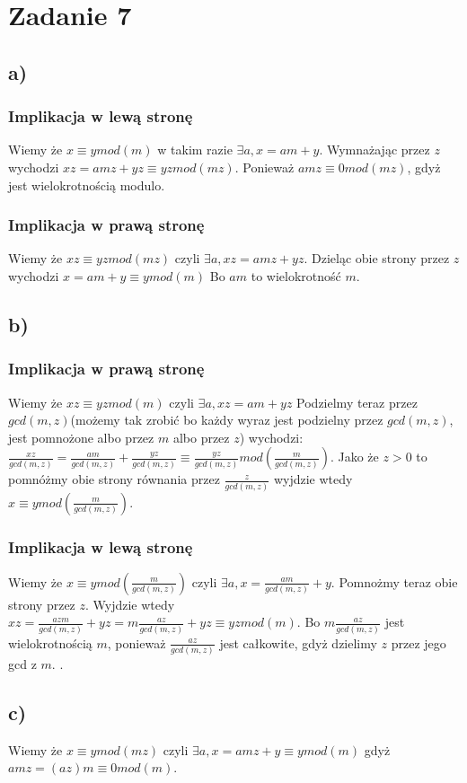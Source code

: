 \documentclass{article}
\begin{document}
\section*{Zadanie 7}
\subsection*{a)}
\subsubsection*{Implikacja w lewą stronę}
Wiemy że $x \equiv y mod(m)$ w takim razie $\exists a, x = a m + y$. Wymnażając przez $z$ wychodzi $x z = a m z + y z \equiv y z mod(m z)$. Ponieważ $a m z \equiv 0 mod(m z)$, gdyż jest wielokrotnością modulo.

\subsubsection*{Implikacja w prawą stronę}
Wiemy że $x z \equiv y z mod(m z)$ czyli $\exists a, x z = a m z + y z$. Dzieląc obie strony przez $z$ wychodzi 
$x = a m + y \equiv y mod (m)$ Bo $a m$ to wielokrotność $m$.

\subsection*{b)}
\subsubsection*{Implikacja w prawą stronę}
Wiemy że $x z \equiv y z mod(m)$ czyli $\exists a, x z = a m + y z$ Podzielmy teraz przez $gcd(m, z)$(możemy tak zrobić bo każdy wyraz jest podzielny przez $gcd(m,z)$, jest pomnożone albo przez $m$ albo przez $z$) wychodzi: $\frac{x z}{gcd(m, z)} = \frac{a m}{gcd(m, z)} + \frac{y z}{gcd(m, z)} \equiv \frac{y z}{gcd(m,z)} mod(\frac{m}{gcd(m, z)})$. Jako że $z > 0$ to pomnóżmy obie strony równania przez $\frac{z}{gcd(m, z)}$ wyjdzie wtedy $x \equiv y mod(\frac{m}{gcd(m, z)})$.

\subsubsection*{Implikacja w lewą stronę}

Wiemy że $x \equiv y mod(\frac{m}{gcd(m, z)})$ czyli $\exists a, x = \frac{a m}{gcd(m, z)} + y$. Pomnożmy teraz obie strony przez $z$. Wyjdzie wtedy $x z = \frac{a z m}{gcd(m, z)} + y z = m \frac{a z}{gcd(m, z)} + y z \equiv yz mod (m)$. Bo $m \frac{a z}{gcd(m, z)}$ jest wielokrotnością $m$, ponieważ $\frac{a z}{gcd(m, z)}$ jest całkowite, gdyż dzielimy $z$ przez jego gcd z $m$.
.
\subsection*{c)}
Wiemy że $x \equiv y mod(m z)$ czyli $\exists a, x = a m z + y \equiv y mod (m)$ gdyż $a m z = (a z) m \equiv 0 mod(m) $.
\end{document}
